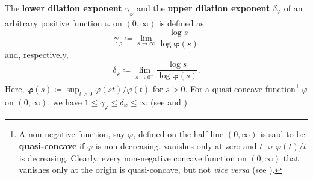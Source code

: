\documentclass[11pt]{amsart}
\theoremstyle{definition}
\theoremstyle{definition}
\theoremstyle{definition}
\theoremstyle{definition}
\theoremstyle{definition}
\theoremstyle{definition}
\theoremstyle{definition}
\theoremstyle{definition}
\numberwithin{equation}{section}
\numberwithin{equation}{section}
\numberwithin{equation}{section}
\theoremstyle{definition}
\theoremstyle{definition}
\theoremstyle{definition}
\theoremstyle{definition}
\theoremstyle{definition}
\theoremstyle{definition}
\newcommand{\thickbar}[1]{\mathbf{\bar{\text{$#1$}}}} %
\begin{document}
The {\bf lower dilation exponent $\gamma_\varphi$} and the {\bf upper dilation exponent $\delta_\varphi$} of an arbitrary positive function
$\varphi$ on $(0,\infty)$ is defined as
\begin{equation}
	\gamma_\varphi \coloneqq \lim\limits_{s \rightarrow \infty} \frac{\log s}{ \log \thickbar{\varphi}(s) }
\end{equation}
and, respectively,
\begin{equation}
	\delta_\varphi \coloneqq \lim\limits_{s \rightarrow 0^{+}} \frac{\log s}{ \log \thickbar{\varphi}(s) }.
\end{equation}
Here, $\thickbar{\varphi}(s) \coloneqq \sup_{t > 0} \varphi(st) / \varphi(t)$ for $s > 0$.
For a quasi-concave function\footnote{A non-negative function, say $\varphi$, defined on the half-line $(0,\infty)$ is said to be {\bf quasi-concave}
if $\varphi$ is non-decreasing, vanishes only at zero and $t \rightsquigarrow \varphi(t) / t$ is decreasing. Clearly, every non-negative concave function
on $(0,\infty)$ that vanishes only at the origin is quasi-concave, but not {\it vice versa} (see \cite[p.~69]{BS88}).} $\varphi$ on $(0,\infty)$,
we have $1 \leqslant \gamma_\varphi \leqslant \delta_\varphi \leqslant \infty$ (see \cite[Theorem~4.12, p.~107]{KPS82} and \cite[pp.~81--95]{Ma89}).
\end{document}
